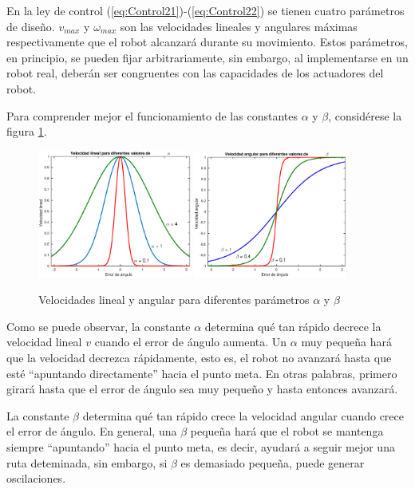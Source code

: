 \documentclass[letterpaper,12pt]{article}
\begin{document}
  En la ley de control (\ref{eq:Control21})-(\ref{eq:Control22}) se tienen cuatro parámetros de diseño. $v_{max}$ y $\omega_{max}$ son las velocidades lineales y angulares máximas respectivamente que el robot alcanzará durante su movimiento. Estos parámetros, en principio,  se pueden fijar arbitrariamente, sin embargo, al implementarse en un robot real, deberán ser congruentes con las capacidades de los actuadores del robot.

  Para comprender mejor el funcionamiento de las constantes $\alpha$ y $\beta$, considérese la figura \ref{fig:LinearAndAngular}. 

  \begin{figure}
    \centering
    \includegraphics[width=0.45\textwidth]{Figures/LinearSpeed.eps}
    \includegraphics[width=0.45\textwidth]{Figures/AngularSpeed.eps}
    \caption{Velocidades lineal y angular para diferentes parámetros $\alpha$ y $\beta$}
    \label{fig:LinearAndAngular}
  \end{figure}

  Como se puede observar, la constante $\alpha$ determina qué tan rápido decrece la velocidad lineal $v$ cuando el error de ángulo aumenta. Un $\alpha$ muy pequeña hará que la velocidad decrezca rápidamente, esto es, el robot no avanzará hasta que esté ``apuntando directamente'' hacia el punto meta. En otras palabras, primero girará hasta que el error de ángulo sea muy pequeño y hasta entonces avanzará.

  La constante $\beta$ determina qué tan rápido crece la velocidad angular cuando crece el error de ángulo. En general, una $\beta$  pequeña hará que el robot se mantenga siempre ``apuntando'' hacia el punto meta, es decir, ayudará a seguir mejor una ruta deteminada, sin embargo, si $\beta$  es demasiado pequeña, puede generar oscilaciones. 
\end{document}
